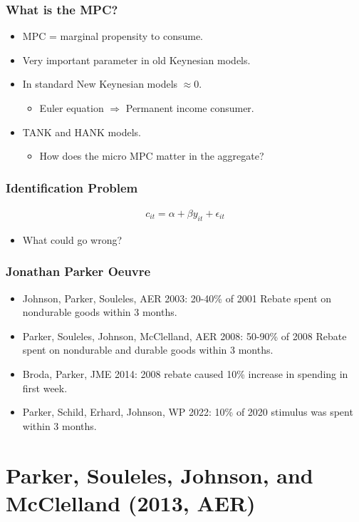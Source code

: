 \documentclass[english,xcolor=svgnames]{beamer}
\begin{document}
\begin{frame}
\frametitle[alignment=center]{What is the MPC?}
\begin{itemize}
	\item MPC = marginal propensity to consume.
	\item Very important parameter in old Keynesian models.
	\item In standard New Keynesian models $\approx 0$.
	\begin{itemize}
		\item Euler equation $\Rightarrow$ Permanent income consumer.
	\end{itemize}
	\item TANK and HANK models.
	\begin{itemize}
		\item How does the micro MPC matter in the aggregate?
	\end{itemize}
\end{itemize}
\end{frame}

\begin{frame}
\frametitle[alignment=center]{Identification Problem}
\begin{align*}
	c_{it}  = \alpha + \beta y_{it} + \epsilon_{it}
\end{align*}
\begin{itemize}
	\item What could go wrong?
\end{itemize}
\end{frame}

\begin{frame}
\frametitle[alignment=center]{Jonathan Parker Oeuvre}
\begin{itemize}
	\item Johnson, Parker, Souleles, AER 2003: 20-40\% of 2001 Rebate spent on nondurable goods within 3 months.
	\item Parker, Souleles, Johnson, McClelland, AER 2008: 50-90\% of 2008 Rebate spent on nondurable and durable goods within 3 months.
	\item Broda, Parker, JME 2014: 2008 rebate caused 10\% increase in spending in first week.
	\item Parker, Schild, Erhard, Johnson, WP 2022: 10\% of 2020 stimulus was spent within 3 months.
\end{itemize}
\end{frame}

\section{Parker, Souleles, Johnson, and McClelland (2013, AER)}
\end{document}
